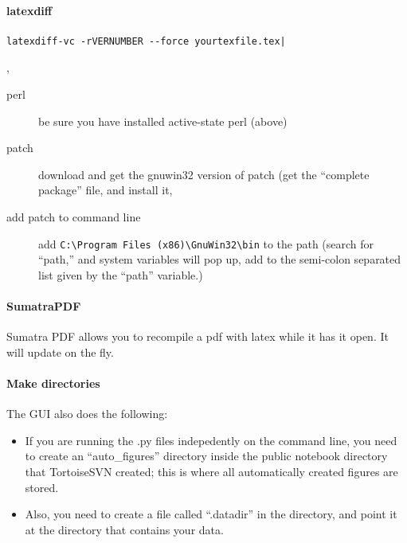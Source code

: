 \paragraph{latexdiff}
\begin{verbatim}latexdiff-vc -rVERNUMBER --force yourtexfile.tex|\end{verbatim},
    \begin{description}
        \item[perl] be sure you have installed active-state perl (above)
        \item[patch] download and get the gnuwin32 version of patch
            (get the ``complete package'' file, and install it,
        \item[add patch to command line] 
            add \verb|C:\Program Files (x86)\GnuWin32\bin| to
            the path (search for ``path,'' and system variables will pop up, add to the semi-colon separated list given by the ``path'' variable.)
    \end{description}
\paragraph{SumatraPDF}
Sumatra PDF allows you to recompile a pdf
    with latex while it has it open.
It will update on the fly.
\paragraph{Make directories}
The GUI also does the following:
\begin{itemize}
    \item If you are running the .py files indepedently on the command line,
        you need to create an ``auto\_figures'' directory
        inside the public notebook directory that TortoiseSVN created;
        this is where all automatically created figures are stored.
    \item Also, you need to create a file called ``.datadir'' in the directory,
            and point it at the directory that contains your data.
\end{itemize}
